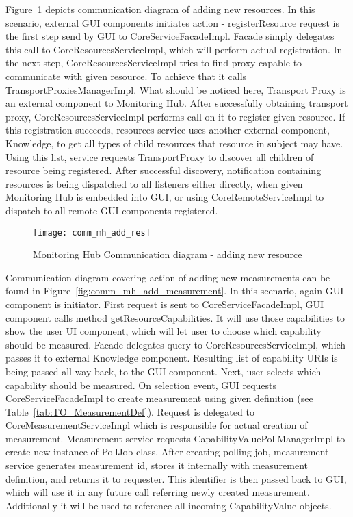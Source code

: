 Figure~\ref{fig:comm_mh_add_res} depicts communication diagram of adding new resources. In this scenario, external GUI components initiates action - registerResource request is the first step send by GUI to CoreServiceFacadeImpl. Facade simply delegates this call to CoreResourcesServiceImpl, which will perform actual registration. In the next step, CoreResourcesServiceImpl tries to find proxy capable to communicate with given resource. To achieve that it calls TransportProxiesManagerImpl. What should be noticed here, Transport Proxy is an external component to Monitoring Hub. After successfully obtaining transport proxy, CoreResourcesServiceImpl performs call on it to register given resource. If this registration succeeds, resources service uses another external component, Knowledge, to get all types of child resources that resource in subject may have. Using this list, service requests TransportProxy to discover all children of resource being registered. After successful discovery, notification containing resources is being dispatched to all listeners either directly, when given Monitoring Hub is embedded into GUI, or using CoreRemoteServiceImpl to dispatch to all remote GUI components registered.

\begin{figure}[ht]
\centering
\texttt{[image: comm\_mh\_add\_res]}
\caption{Monitoring Hub Communication diagram - adding new resource}
\label{fig:comm_mh_add_res}
\end{figure}

Communication diagram covering action of adding new measurements can be found in Figure~\ref{fig:comm_mh_add_measurement}. In this scenario, again GUI component is initiator. First request is sent to CoreServiceFacadeImpl, GUI component calls method getResourceCapabilities. It will use those capabilities to show the user UI component, which will let user to choose which capability should be measured. Facade delegates query to CoreResourcesServiceImpl, which passes it to external Knowledge component. Resulting list of capability URIs is being passed all way back, to the GUI component. Next, user selects which capability should be measured. On selection event, GUI requests CoreServiceFacadeImpl to create measurement using given definition (see Table~\ref{tab:TO_MeasurementDef}). Request is delegated to CoreMeasurementServiceImpl which is responsible for actual creation of measurement. Measurement service requests CapabilityValuePollManagerImpl to create new instance of PollJob class. After creating polling job, measurement service generates measurement id, stores it internally with measurement definition, and returns it to requester. This identifier is then passed back to GUI, which will use it in any future call referring newly created measurement. Additionally it will be used to reference all incoming CapabilityValue objects.

